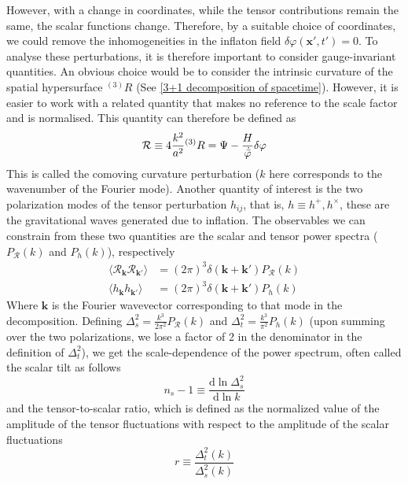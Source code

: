 \documentclass[aps,prd,reprint,preprintnumbers,showpacs,floatfix,nofootinbib,superscript address]{revtex4-2}
\begin{document}
However, with a change in coordinates, while the tensor contributions remain the same, the scalar functions change. Therefore, by a suitable choice of coordinates, we could remove the inhomogeneities in the inflaton field $\delta \varphi(\textbf{x}',t') = 0$. To analyse these perturbations, it is therefore important to consider gauge-invariant quantities. An obvious choice would be to consider the intrinsic curvature of the spatial hypersurface ${}^{(3)}R$ (See \cref{3+1 decomposition of spacetime}). However, it is easier to work with a related quantity that makes no reference to the scale factor and is normalised. This quantity can therefore be defined as
\begin{equation} \label{comoving curvature perurbation}
    \mathcal{R} \equiv 4 \frac{k^2}{a^2} {}^{(3)}R = \Psi - \frac{H}{\dot{\Bar{\varphi}}}\delta \varphi
\end{equation}
This is called the comoving curvature perturbation ($k$ here corresponds to the wavenumber of the Fourier mode). Another quantity of interest is the two polarization modes of the tensor perturbation $h_{ij}$, that is, $h \equiv h^+ , h^\times$, these are the gravitational waves generated due to inflation. The observables we can constrain from these two quantities are the scalar and tensor power spectra ($P_\mathcal{R}(k)$ and $P_h(k)$), respectively
\begin{align}
    \langle \mathcal{R}_{\bm{k}} \mathcal{R}_{\bm{k}'} \rangle &= (2\pi)^3 \delta(\bm{k}+\bm{k}')P_\mathcal{R}(k) \\
    \langle h_{\bm{k}} h_{\bm{k}'} \rangle &= (2\pi)^3 \delta(\bm{k}+\bm{k}')P_h(k)
\end{align}
Where $\bm{k}$ is the Fourier wavevector corresponding to that mode in the decomposition. Defining $\Delta_s^2 = \frac{k^3}{2\pi^2} P_\mathcal{R}(k)$ and $\Delta_t^2 = \frac{k^3}{\pi^2} P_h(k)$ (upon summing over the two polarizations, we lose a factor of 2 in the denominator in the definition of $\Delta_t^2$), we get the scale-dependence of the power spectrum, often called the scalar tilt as follows
\begin{equation}
    n_s - 1 \equiv \frac{\text{d} \ln \Delta_s^2}{\text{d} \ln k}
\end{equation}
and the tensor-to-scalar ratio, which is defined as the normalized value of the amplitude of the tensor fluctuations with respect to the amplitude of the scalar fluctuations
\begin{equation}
    r \equiv \frac{\Delta_t^2(k)}{\Delta_s^2(k)}
\end{equation}
\end{document}

